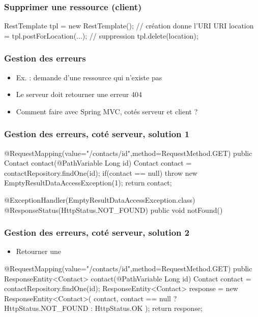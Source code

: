 \begin{frame}[fragile]
 \frametitle{Supprimer une ressource (client)}

 \begin{javacode}
RestTemplate tpl = new RestTemplate();
// cr\'eation donne l'URI
URI location = tpl.postForLocation(...);
// suppression
tpl.delete(location);
 \end{javacode}

\end{frame}

\begin{frame}
 \frametitle{Gestion des erreurs}

 \begin{itemize}
  \item Ex. : demande d'une ressource qui n'existe pas
  \item Le serveur doit retourner une erreur 404
  \item Comment faire avec Spring MVC, cotés serveur et client ?
 \end{itemize}

\end{frame}

\begin{frame}[fragile]
 \frametitle{Gestion des erreurs, coté serveur, solution 1}

 \begin{javacode}
@RequestMapping(value="/contacts/{id}",method=RequestMethod.GET)
public Contact contact(@PathVariable Long id) {
  Contact contact = contactRepository.findOne(id);
  if(contact == null) {
    throw new EmptyResultDataAccessException(1);
  }
  return contact;
}

@ExceptionHandler(EmptyResultDataAccessException.class)
@ResponseStatus(HttpStatus.NOT_FOUND)
public void notFound() { }
 \end{javacode}

\end{frame}

\begin{frame}[fragile]
 \frametitle{Gestion des erreurs, coté serveur, solution 2}

 \begin{itemize}
  \item Retourner une 
 \end{itemize}

 \begin{javacode}
@RequestMapping(value="/contacts/{id}",method=RequestMethod.GET)
public ResponseEntity<Contact> contact(@PathVariable Long id) {
  Contact contact = contactRepository.findOne(id);
  ResponseEntity<Contact> response = new ResponseEntity<Contact>(
    contact,
    contact == null ? HttpStatus.NOT_FOUND : HttpStatus.OK
  );
  return response;
}
 \end{javacode}

\end{frame}

